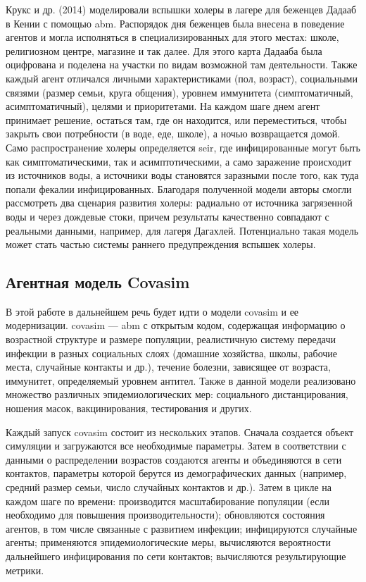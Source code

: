 \documentclass[a4paper,12pt]{article} %
\begin{document}
Крукс и др. (2014) \cite{crooks2014agent} моделировали вспышки холеры в лагере для беженцев Дадааб в Кении с помощью \gls{abm}. Распорядок дня беженцев была внесена в поведение агентов и могла исполняться в специализированных для этого местах: школе, религиозном центре, магазине и так далее. Для этого карта Дадааба была оцифрована и поделена на участки по видам возможной там деятельности. Также каждый агент отличался личными характеристиками (пол, возраст), социальными связями (размер семьи, круга общения), уровнем иммунитета (симптоматичный, асимптоматичный), целями и приоритетами. На каждом шаге днем агент принимает решение, остаться там, где он находится, или переместиться, чтобы закрыть свои потребности (в воде, еде, школе), а ночью возвращается домой. Само распространение холеры определяется \gls{seir}, где инфицированные могут быть как симптоматическими, так и асимптотическими, а само заражение происходит из источников воды, а источники воды становятся заразными после того, как туда попали фекалии инфицированных. Благодаря полученной модели авторы смогли рассмотреть два сценария развития холеры: радиально от источника загрязенной воды и через дождевые стоки, причем результаты качественно совпадают с реальными данными, например, для лагеря Дагахлей. Потенциально такая модель может стать частью системы раннего предупреждения вспышек холеры.




\subsection{Агентная модель Covasim}

В этой работе в дальнейшем речь будет идти о модели \gls{covasim} и ее модернизации. \gls{covasim} --- \gls{abm} с открытым кодом, содержащая информацию о возрастной структуре и размере популяции, реалистичную систему передачи инфекции в разных социальных слоях (домашние хозяйства, школы, рабочие места, случайные контакты и др.), течение болезни, зависящее от возраста, иммунитет, определяемый уровнем антител. Также в данной модели реализовано множество различных эпидемиологических мер: социального дистанцирования, ношения масок, вакцинирования, тестирования и других.

Каждый запуск \gls{covasim} состоит из нескольких этапов. Сначала создается объект симуляции и загружаются все необходимые параметры. Затем в соответствии с данными о распределении возрастов создаются агенты и объединяются в сети контактов, параметры которой берутся из демографических данных (например, средний размер семьи, число случайных контактов и др.). Затем в цикле на каждом шаге по времени: производится масштабирование популяции (если необходимо для повышения производительности); обновляются состояния агентов, в том числе связанные с развитием инфекции; инфицируются случайные агенты; применяются эпидемиологические меры, вычисляются вероятности дальнейшего инфицирования по сети контактов; вычисляются результирующие метрики.
\end{document}
